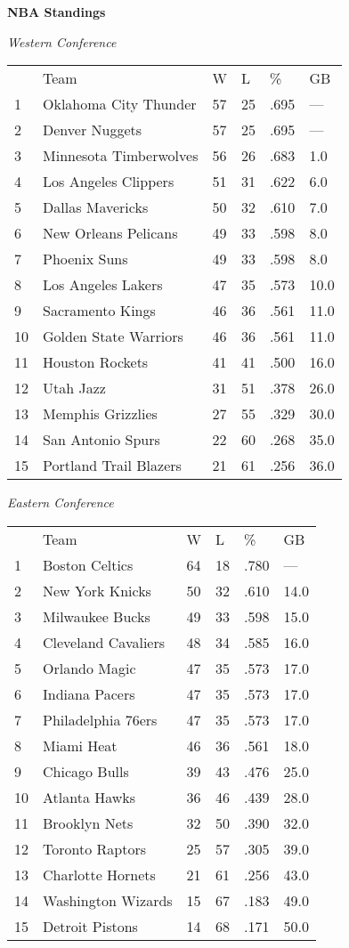 \textbf{NBA Standings}

\textit{Western Conference}
\begin{tabular}{llllll}
 & Team & W & L & \% & GB \\
1 & Oklahoma City Thunder & 57 & 25 & .695 & — \\
2 & Denver Nuggets & 57 & 25 & .695 & — \\
3 & Minnesota Timberwolves & 56 & 26 & .683 & 1.0 \\
4 & Los Angeles Clippers & 51 & 31 & .622 & 6.0 \\
5 & Dallas Mavericks & 50 & 32 & .610 & 7.0 \\
6 & New Orleans Pelicans & 49 & 33 & .598 & 8.0 \\
7 & Phoenix Suns & 49 & 33 & .598 & 8.0 \\
8 & Los Angeles Lakers & 47 & 35 & .573 & 10.0 \\
9 & Sacramento Kings & 46 & 36 & .561 & 11.0 \\
10 & Golden State Warriors & 46 & 36 & .561 & 11.0 \\
11 & Houston Rockets & 41 & 41 & .500 & 16.0 \\
12 & Utah Jazz & 31 & 51 & .378 & 26.0 \\
13 & Memphis Grizzlies & 27 & 55 & .329 & 30.0 \\
14 & San Antonio Spurs & 22 & 60 & .268 & 35.0 \\
15 & Portland Trail Blazers & 21 & 61 & .256 & 36.0 \\
\end{tabular}


\textit{Eastern Conference}
\begin{tabular}{llllll}
 & Team & W & L & \% & GB \\
1 & Boston Celtics & 64 & 18 & .780 & — \\
2 & New York Knicks & 50 & 32 & .610 & 14.0 \\
3 & Milwaukee Bucks & 49 & 33 & .598 & 15.0 \\
4 & Cleveland Cavaliers & 48 & 34 & .585 & 16.0 \\
5 & Orlando Magic & 47 & 35 & .573 & 17.0 \\
6 & Indiana Pacers & 47 & 35 & .573 & 17.0 \\
7 & Philadelphia 76ers & 47 & 35 & .573 & 17.0 \\
8 & Miami Heat & 46 & 36 & .561 & 18.0 \\
9 & Chicago Bulls & 39 & 43 & .476 & 25.0 \\
10 & Atlanta Hawks & 36 & 46 & .439 & 28.0 \\
11 & Brooklyn Nets & 32 & 50 & .390 & 32.0 \\
12 & Toronto Raptors & 25 & 57 & .305 & 39.0 \\
13 & Charlotte Hornets & 21 & 61 & .256 & 43.0 \\
14 & Washington Wizards & 15 & 67 & .183 & 49.0 \\
15 & Detroit Pistons & 14 & 68 & .171 & 50.0 \\
\end{tabular}



